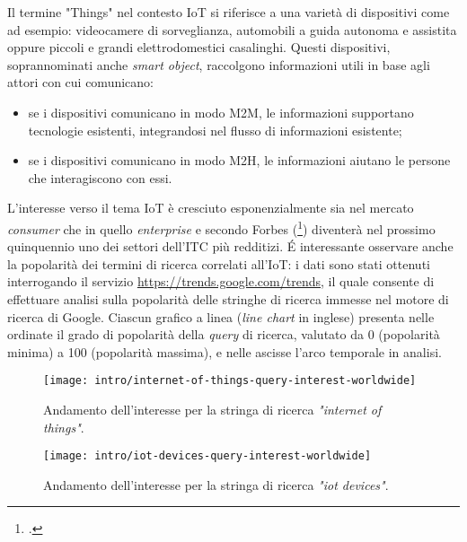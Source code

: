 Il termine "Things" nel contesto IoT si riferisce a una varietà di dispositivi come ad esempio: videocamere di sorveglianza, automobili a guida autonoma e assistita oppure piccoli e grandi elettrodomestici casalinghi. Questi dispositivi, soprannominati anche \textit{smart object}, raccolgono informazioni utili in base agli attori con cui comunicano:
\begin{itemize}
  \item se i dispositivi comunicano in modo M2M, le informazioni supportano tecnologie esistenti, integrandosi nel flusso di informazioni esistente;
  \item se i dispositivi comunicano in modo M2H, le informazioni aiutano le persone che interagiscono con essi.
\end{itemize}

L'interesse verso il tema IoT è cresciuto esponenzialmente sia nel mercato \emph{consumer} che in quello \emph{enterprise} e secondo Forbes (\footcite{site:forbes-iot}) diventerà nel prossimo quinquennio uno dei settori dell'ITC più redditizi.
É interessante osservare anche la popolarità dei termini di ricerca correlati all'IoT: i dati sono stati ottenuti interrogando il servizio \url{https://trends.google.com/trends}, il quale consente di effettuare analisi sulla popolarità delle stringhe di ricerca immesse nel motore di ricerca di Google.
Ciascun grafico a linea (\textit{line chart} in inglese) presenta nelle ordinate il grado di popolarità della \textit{query} di ricerca, valutato da 0 (popolarità minima) a 100 (popolarità massima), e nelle ascisse l'arco temporale in analisi.

\begin{figure}[H]
    \centering
    \texttt{[image: intro/internet-of-things-query-interest-worldwide]}
    \caption{Andamento dell'interesse per la stringa di ricerca \textit{"internet of things"}. \\ \cite{site:iot-long-trend}}
    \label{fig:internet-of-things-query-interest}
\end{figure}

\begin{figure}[H]
    \centering
    \texttt{[image: intro/iot-devices-query-interest-worldwide]}
    \caption{Andamento dell'interesse per la stringa di ricerca \textit{"iot devices"}. \\ \cite{site:iot-devices-trend}}
    \label{fig:iot-devices-query-interest}
\end{figure}

